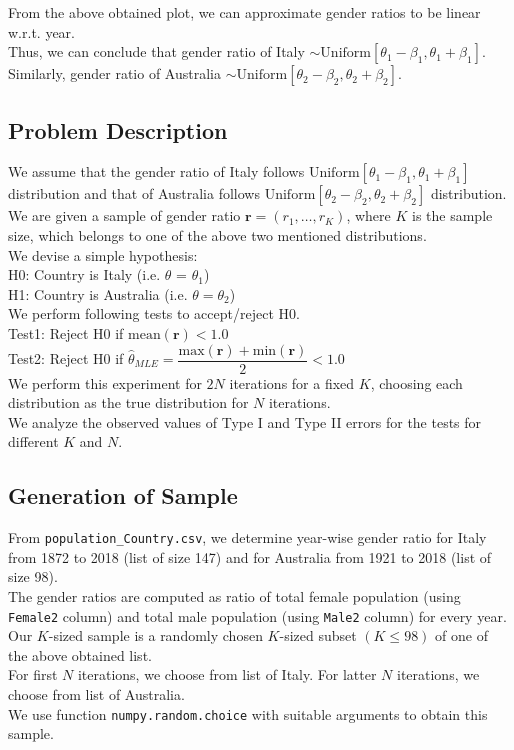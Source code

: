 \documentclass[fleqn, 11pt]{article}
\begin{document}
From the above obtained plot, we can approximate gender ratios to be linear w.r.t. year. \\
Thus, we can conclude that gender ratio of Italy $\sim \mathrm{Uniform}[\theta_1 - \beta_1, \theta_1 + \beta_1]$. \\
Similarly, gender ratio of Australia $\sim \mathrm{Uniform}[\theta_2 - \beta_2, \theta_2 + \beta_2]$.

\subsection{Problem Description}
We assume that the gender ratio of Italy follows $\mathrm{Uniform}[\theta_1 - \beta_1, \theta_1 + \beta_1]$ distribution and that of Australia follows $\mathrm{Uniform}[\theta_2 - \beta_2, \theta_2 + \beta_2]$ distribution. \\
We are given a sample of gender ratio $\mathbf{r} = (r_1, \dots, r_K)$, where $K$ is the sample size, which belongs to one of the above two mentioned distributions. \\
We devise a simple hypothesis: \\
H0: Country is Italy (i.e. $\theta$ = $\theta_1$) \\
H1: Country is Australia (i.e. $\theta = \theta_2$) \\
We perform following tests to accept/reject H0. \\
Test1: Reject H0 if $\mathrm{mean}(\mathbf{r}) < 1.0$ \\
Test2: Reject H0 if $\hat{\theta}_{MLE} = \dfrac{\mathrm{max}(\mathbf{r}) + \mathrm{min}(\mathbf{r})}{2} < 1.0$ \\
We perform this experiment for $2N$ iterations for a fixed $K$, choosing each distribution as the true distribution for $N$ iterations. \\
We analyze the observed values of Type I and Type II errors for the tests for different $K$ and $N$.

\subsection{Generation of Sample}
From \verb!population_Country.csv!, we determine year-wise gender ratio for Italy from 1872 to 2018 (list of size 147) and for Australia from 1921 to 2018 (list of size 98). \\
The gender ratios are computed as ratio of total female population (using \verb!Female2! column) and total male population (using \verb!Male2! column) for every year. \\
Our $K$-sized sample is a randomly chosen $K$-sized subset $(K \le 98)$ of one of the above obtained list. \\
For first $N$ iterations, we choose from list of Italy. For latter $N$ iterations, we choose from list of Australia. \\
We use function \verb!numpy.random.choice! with suitable arguments to obtain this sample. \\
\end{document}
